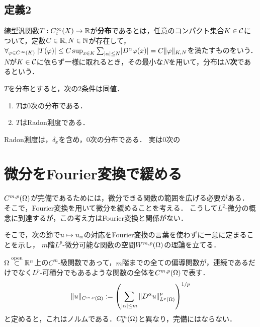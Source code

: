 \documentclass[uplatex,dvipdfmx]{jsreport}
\begin{document}
\subsection{定義2}

\begin{definition}
    線型汎関数$T:C^\infty_c(X)\to\mathbb{R}$が\textbf{分布}であるとは，任意のコンパクト集合$K\in\mathcal{C}$について，定数$C\in\mathbb{R},N\in\mathbb{N}$が存在して，$\forall_{\varphi\in C^\infty(K)}\;\lvert T(\varphi)\rvert\le C\sup_{x\in K}\sum_{\lvert\alpha\rvert\le N}\lvert D^\alpha\varphi(x)\rvert=C\|\varphi\|_{K,N}$を満たすものをいう．
    $N$が$K\in\mathcal{C}$に依らず一様に取れるとき，その最小な$N$を用いて，分布は\textbf{$N$次}であるという．
\end{definition}

\begin{theorem}
    $T$を分布とすると，次の2条件は同値．
    \begin{enumerate}
        \item $T$は$0$次の分布である．
        \item $T$はRadon測度である．
    \end{enumerate}
\end{theorem}

\begin{example}
    Radon測度は，$\delta_x$を含め，$0$次の分布である．
    実は$0$次の
\end{example}

\section{微分をFourier変換で緩める}

\begin{tcolorbox}[colframe=ForestGreen, colback=ForestGreen!10!white,breakable,colbacktitle=ForestGreen!40!white,coltitle=black,fonttitle=\bfseries\sffamily,
title=]
    $C^{m,p}(\Omega)$が完備であるためには，微分できる関数の範囲を広げる必要がある．
    そこで，Fourier変換を用いて微分を緩めることを考える．
    こうして$L^2$-微分の概念に到達するが，この考え方はFourier変換と関係がない．
    
    そこで，次の節で$u\mapsto u_\alpha$の対応をFourier変換の言葉を使わずに一意に定まることを示し，
    $m$階$L^p$-微分可能な関数の空間$W^{m,p}(\Omega)$の理論を立てる．
\end{tcolorbox}

\begin{notation}
    $\Omega\overset{\mathrm{open}}{\subset}\mathbb{R}^n$上の$C^m$-級関数であって，$m$階までの全ての偏導関数が，連続であるだけでなく$L^p$-可積分でもあるような関数の全体を$C^{m,p}(\Omega)$で表す．
    \[\|u\|_{C^{m,p}(\Omega)}:=\left(\sum_{\lvert\alpha\rvert\le m}\|D^\alpha u\|^p_{L^p(\Omega)}\right)^{1/p}\]
    と定めると，これはノルムである．$C_b^m(\Omega)$と異なり，完備にはならない．
\end{notation}
\end{document}
